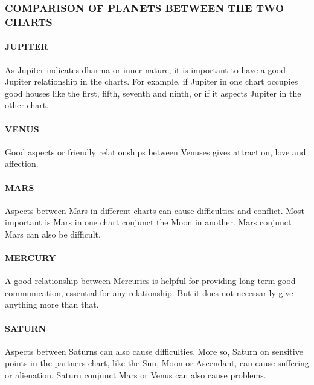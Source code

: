  

\subsubsection{COMPARISON OF PLANETS BETWEEN THE TWO CHARTS}

 

\paragraph{JUPITER}

As Jupiter indicates dharma or inner nature, it is important to have a good Jupiter relationship in the charts. For example, if Jupiter in one chart occupies good houses like the first, fifth, seventh and ninth, or if it aspects Jupiter in the other chart.

 

\paragraph{VENUS}

Good aspects or friendly relationships between Venuses gives attraction, love and affection.

 

\paragraph{MARS}

Aspects between Mars in different charts can cause difficulties and conflict. Most important is Mars in one chart conjunct the Moon in another. Mars conjunct Mars can also be difficult.

 

\paragraph{MERCURY}

A good relationship between Mercuries is helpful for providing long term good communication, essential for any relationship. But it does not necessarily give anything more than that.

 

\paragraph{SATURN}

Aspects between Saturns can also cause difficulties. More so, Saturn on sensitive points in the partners chart, like the Sun, Moon or Ascendant, can cause suffering or alienation. Saturn conjunct Mars or Venus can also cause problems.



